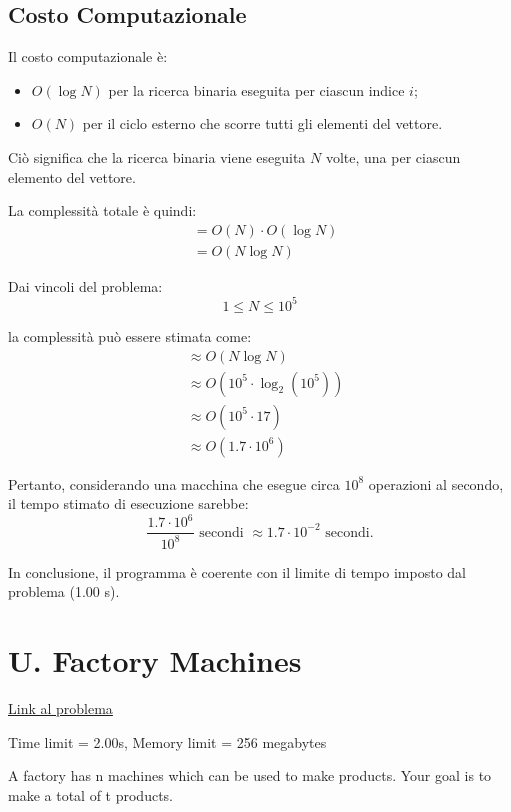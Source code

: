 \newpage

\subsection*{Costo Computazionale}
Il costo computazionale è:
\begin{itemize}
	\item $O(\log N)$ per la ricerca binaria eseguita per ciascun indice $i$;
	\item $O(N)$ per il ciclo esterno che scorre tutti gli elementi del vettore.
\end{itemize}

Ciò significa che la ricerca binaria viene eseguita $N$ volte, una per ciascun elemento del vettore.

La complessità totale è quindi:
\begin{align*}
	&= O(N) \cdot O(\log N) \\
	&= O(N \log N)
\end{align*}

Dai vincoli del problema:
\[
1 \le N \le 10^5
\]

la complessità può essere stimata come:
\begin{align*}
	&\approx O(N \log N) \\
	&\approx O(10^5 \cdot \log_2(10^5)) \\
	&\approx O(10^5 \cdot 17) \\
	&\approx O(1.7 \cdot 10^6)
\end{align*}

Pertanto, considerando una macchina che esegue circa $10^8$ operazioni al secondo, il tempo stimato di esecuzione sarebbe:
\[
\frac{1.7 \cdot 10^6}{10^8} \text{ secondi } \approx 1.7 \cdot 10^{-2} \text{ secondi.}
\]

\noindent
In conclusione, il programma è coerente con il limite di tempo imposto dal problema (1.00 s).

\newpage
\section{U. Factory Machines}

\href{https://codeforces.com/gym/102961/problem/U}{Link al problema} 

\smallskip

\noindent Time limit = 2.00s, Memory limit = 256 megabytes

\bigskip

A factory has n machines which can be used to make products. Your goal is to make a total of t products.

